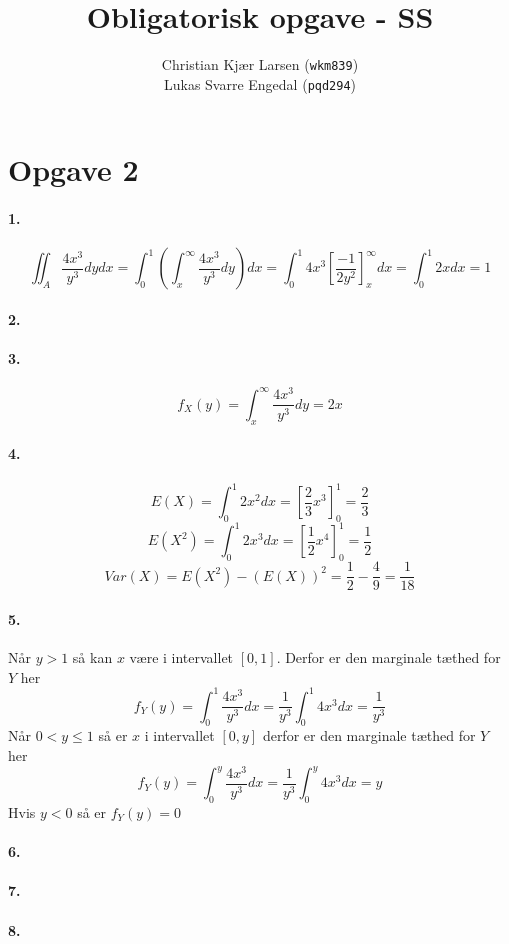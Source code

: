 \documentclass[12pt]{article}
\title{Obligatorisk opgave - SS}
\author{Christian Kjær Larsen (\texttt{wkm839})\\ Lukas Svarre Engedal (\texttt{pqd294})}
\begin{document}
\maketitle

\section*{Opgave 2}

\paragraph{1.}

\[
    \iint_A \frac{4x^3}{y^3} dydx = \int_0^1 \left( \int_x^\infty \frac{4x^3}{y^3} dy \right) dx
    = \int_0^1 4x^3 \left[ \frac{-1}{2y^2} \right]_x^\infty dx
    = \int_0^1 2x dx = 1
\]

\paragraph{2.}

\paragraph{3.}
\[
    f_X(y)=\int_x^\infty \frac{4x^3}{y^3} dy = 2x
\]
\paragraph{4.}
\[
    E(X) = \int_0^1 2x^2 dx = \left[ \frac{2}{3}x^3 \right]_0^1 = \frac{2}{3}
\]
\[
    E(X^2) = \int_0^1 2x^3 dx = \left[ \frac{1}{2}x^4 \right]_0^1 = \frac{1}{2}
\]
\[
    Var(X) = E(X^2) - (E(X))^2 = \frac{1}{2} - \frac{4}{9} = \frac{1}{18}
\]
\paragraph{5.}
Når $y > 1$ så kan $x$ være i intervallet $[0,1]$. Derfor er den marginale tæthed for $Y$ her
\[
    f_Y(y) = \int_0^1 \frac{4x^3}{y^3} dx = \frac{1}{y^3} \int_0^1 4x^3 dx = \frac{1}{y^3}
\]
Når $0 < y \leq 1$ så er $x$ i intervallet $[0, y]$ derfor er den marginale tæthed for $Y$ her
\[
    f_Y(y) = \int_0^y \frac{4x^3}{y^3} dx = \frac{1}{y^3} \int_0^y 4x^3 dx = y
\]
Hvis $y < 0$ så er $f_Y(y) = 0$
\paragraph{6.}
\paragraph{7.}
\paragraph{8.}
\end{document}
